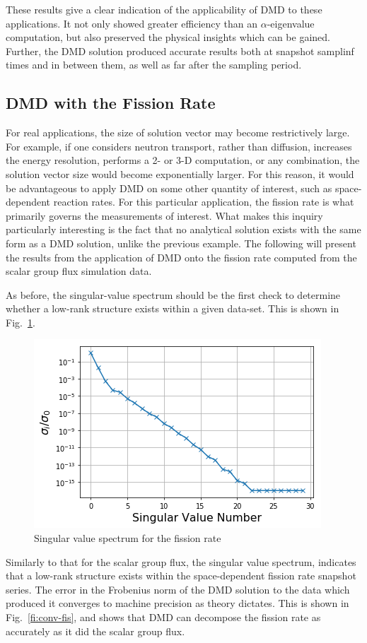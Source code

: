 \documentclass[12pt]{article}
\newcommand{\LFI}[1]{\label{fi:#1}}
\newcommand{\FI}[1]{Fig.~\ref{fi:#1}}
\newcommand{\bfg}{\begin{figure}}
\newcommand{\efg}{\end{figure}}
\begin{document}
These results give a clear indication of the applicability of DMD to these 
	applications.
It not only showed greater efficiency than an $\alpha$-eigenvalue computation, 
	but also preserved the physical insights which can be gained.
Further, the DMD solution produced accurate results both at snapshot samplinf 
times and in between them, as well as far after the sampling period.

\subsection{DMD with the Fission Rate}
For real applications, the size of solution vector may become restrictively 
large. 
For example, if one considers neutron transport, rather than diffusion, 
	increases the energy resolution,  performs a 2- or 3-D computation, or any 
	combination, the solution vector size would become exponentially larger. 
For this reason, it would be  advantageous to apply DMD on some other quantity 
	of interest, such as space-dependent reaction rates.
For this particular application, the fission rate is what primarily governs the 
	measurements of interest.
What makes this inquiry particularly interesting is the fact that no analytical
	solution exists with the same form as a DMD solution, unlike the previous
	example.
The following will present the results from the application of DMD onto the 
	fission rate computed from the scalar group flux simulation data.

As before, the singular-value spectrum should be the first check to determine 
	whether a low-rank structure exists within a given data-set. 
This is shown in \FI{sv-fis}.
%
\bfg[!htb] \centering
	\includegraphics[scale=0.5]{singularValueSpectrum_fis.png}
	\caption{Singular value spectrum for the fission rate}
	\LFI{sv-fis}
\efg
Similarly to that for the scalar group flux, the singular value spectrum, 
	indicates that a low-rank structure exists within the space-dependent fission 
	rate snapshot series.
The error in the Frobenius norm of the DMD solution to the data which produced 
	it converges to machine precision as theory dictates.
This is shown in \FI{conv-fis}, and shows that DMD can decompose the fission
	rate as accurately as it did the scalar group flux.
\end{document}
